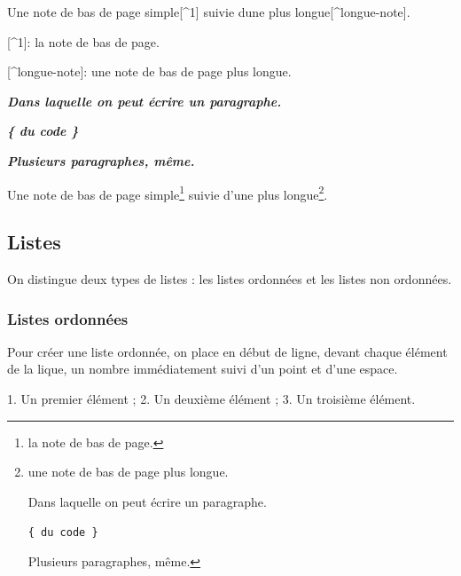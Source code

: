 \documentclass[
  11pt,
]{book}
\newenvironment{Shaded}{\begin{snugshade}}{\end{snugshade}}
\newcommand{\InformationTok}[1]{\textcolor[rgb]{0.56,0.35,0.01}{\textbf{\textit{#1}}}}
\newcommand{\NormalTok}[1]{#1}
\newcommand{\OtherTok}[1]{\textcolor[rgb]{0.56,0.35,0.01}{#1}}
\newcommand{\SpecialStringTok}[1]{\textcolor[rgb]{0.31,0.60,0.02}{#1}}
\numberwithin{equation}{section}
\numberwithin{countremarque}{section}
\begin{document}
\begin{Shaded}
\begin{Highlighting}[]
\NormalTok{Une note de bas de page simple}\OtherTok{[\^{}1]}\NormalTok{ suivie d\textquotesingle{}une plus longue}\OtherTok{[\^{}longue{-}note]}\NormalTok{.}

\OtherTok{[\^{}1]: }\NormalTok{la note de bas de page.}

\OtherTok{[\^{}longue{-}note]: }\NormalTok{une note de bas de page plus longue.}

\InformationTok{    Dans laquelle on peut écrire un paragraphe.}

\InformationTok{    \textasciigrave{}\{ du code \}\textasciigrave{}}

\InformationTok{    Plusieurs paragraphes, même.}
\end{Highlighting}
\end{Shaded}

Une note de bas de page simple\footnote{la note de bas de page.} suivie d'une plus longue\footnote{une note de bas de page plus longue.

  Dans laquelle on peut écrire un paragraphe.

  \texttt{\{\ du\ code\ \}}

  Plusieurs paragraphes, même.}.

\hypertarget{listes-1}{%
\subsection{Listes}\label{listes-1}}

On distingue deux types de listes : les listes ordonnées et les listes non ordonnées.

\hypertarget{listes-ordonnuxe9es}{%
\subsubsection{Listes ordonnées}\label{listes-ordonnuxe9es}}

Pour créer une liste ordonnée, on place en début de ligne, devant chaque élément de la lique, un nombre immédiatement suivi d'un point et d'une espace.

\begin{Shaded}
\begin{Highlighting}[]
\SpecialStringTok{1. }\NormalTok{Un premier élément ;}
\SpecialStringTok{2. }\NormalTok{Un deuxième élément ;}
\SpecialStringTok{3. }\NormalTok{Un troisième élément.}
\end{Highlighting}
\end{Shaded}
\end{document}
